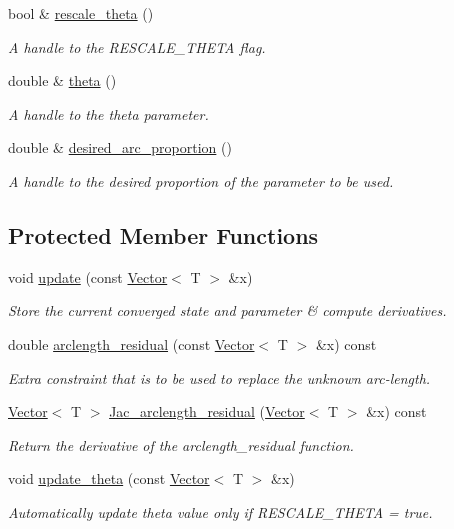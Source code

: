 \begin{DoxyCompactItemize}
bool \& \hyperlink{classLuna_1_1Arclength_ad7be910825086e7faa134bf956342a82}{rescale\+\_\+theta} ()
\begin{DoxyCompactList}\small\item\em A handle to the R\+E\+S\+C\+A\+L\+E\+\_\+\+T\+H\+E\+TA flag. \end{DoxyCompactList}\item 
double \& \hyperlink{classLuna_1_1Arclength_a7e117fb2774052fc240e0eb0e4aac08c}{theta} ()
\begin{DoxyCompactList}\small\item\em A handle to the theta parameter. \end{DoxyCompactList}\item 
double \& \hyperlink{classLuna_1_1Arclength_a4a14037ceffcca21d1417c22894470fb}{desired\+\_\+arc\+\_\+proportion} ()
\begin{DoxyCompactList}\small\item\em A handle to the desired proportion of the parameter to be used. \end{DoxyCompactList}\end{DoxyCompactItemize}
\subsection*{Protected Member Functions}
\begin{DoxyCompactItemize}
\item 
void \hyperlink{classLuna_1_1Arclength_a8941ac2150d8a53aaefbf5825553c86b}{update} (const \hyperlink{classLuna_1_1Vector}{Vector}$<$ T $>$ \&x)
\begin{DoxyCompactList}\small\item\em Store the current converged state and parameter \& compute derivatives. \end{DoxyCompactList}\item 
double \hyperlink{classLuna_1_1Arclength_af47a50bb4ce666b505fe990ab44063db}{arclength\+\_\+residual} (const \hyperlink{classLuna_1_1Vector}{Vector}$<$ T $>$ \&x) const
\begin{DoxyCompactList}\small\item\em Extra constraint that is to be used to replace the unknown arc-\/length. \end{DoxyCompactList}\item 
\hyperlink{classLuna_1_1Vector}{Vector}$<$ T $>$ \hyperlink{classLuna_1_1Arclength_a3bffa2fa38c73cd97155289bc902ccc6}{Jac\+\_\+arclength\+\_\+residual} (\hyperlink{classLuna_1_1Vector}{Vector}$<$ T $>$ \&x) const
\begin{DoxyCompactList}\small\item\em Return the derivative of the arclength\+\_\+residual function. \end{DoxyCompactList}\item 
void \hyperlink{classLuna_1_1Arclength_a47d02a96d4b0a5112e6b06d3787409b5}{update\+\_\+theta} (const \hyperlink{classLuna_1_1Vector}{Vector}$<$ T $>$ \&x)
\begin{DoxyCompactList}\small\item\em Automatically update theta value only if R\+E\+S\+C\+A\+L\+E\+\_\+\+T\+H\+E\+TA = true. \end{DoxyCompactList}\end{DoxyCompactItemize}
